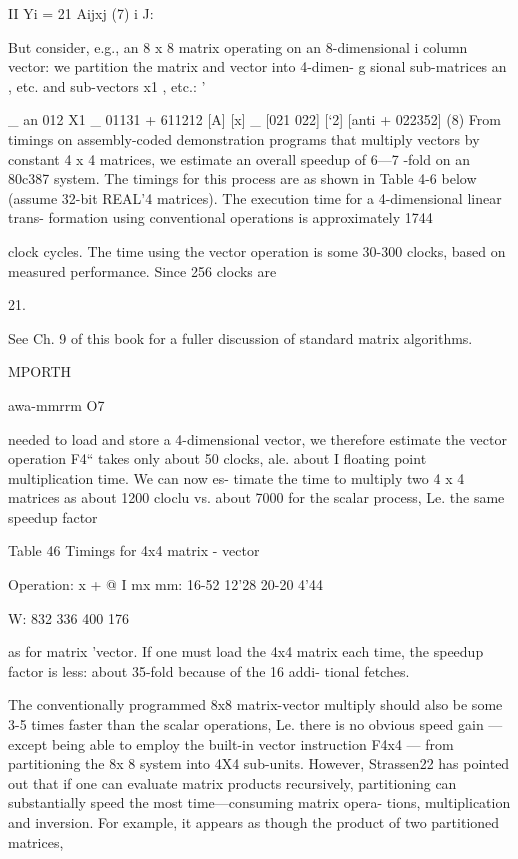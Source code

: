 {{{{{{{{{{{{{{{{   

II
Yi = 21 Aijxj (7) i
J:

But consider, e.g., an 8 x 8 matrix operating on an 8-dimensional i
column vector: we partition the matrix and vector into 4-dimen- g
sional sub-matrices an , etc. and sub-vectors x1 , etc.: '

_ an 012 X1 _ 01131 + 611212
[A] [x] _ [021 022] [‘2] [anti + 022352] (8)
From timings on assembly-coded demonstration programs that
multiply vectors by constant 4 x 4 matrices, we estimate an overall
speedup of 6—7 -fold on an 80c387 system. The timings for this
process are as shown in Table 4-6 below (assume 32-bit REAL'4
matrices). The execution time for a 4-dimensional linear trans-
formation using conventional operations is approximately 1744

clock cycles. The time using the vector operation is some 30-300
clocks, based on measured performance. Since 256 clocks are

 

21.

See Ch. 9 of this book for a fuller discussion of standard matrix algorithms.

MPORTH

awa-mmrrm O7

needed to load and store a 4-dimensional vector, we therefore
estimate the vector operation F4“ takes only about 50 clocks,
ale. about I floating point multiplication time. We can now es-
timate the time to multiply two 4 x 4 matrices as about 1200 cloclu
vs. about 7000 for the scalar process, Le. the same speedup factor

Table 46 Timings for 4x4 matrix - vector

 

Operation: x + @ I
mx mm: 16-52 12'28 20-20 4'44

W: 832 336 400 176

 

 

 

as for matrix 'vector. If one must load the 4x4 matrix each time,
the speedup factor is less: about 35-fold because of the 16 addi-
tional fetches.

The conventionally programmed 8x8 matrix-vector multiply
should also be some 3-5 times faster than the scalar operations,
Le. there is no obvious speed gain — except being able to employ
the built-in vector instruction F4x4 — from partitioning the 8x 8
system into 4X4 sub-units. However, Strassen22 has pointed out
that if one can evaluate matrix products recursively, partitioning
can substantially speed the most time—consuming matrix opera-
tions, multiplication and inversion. For example, it appears as
though the product of two partitioned matrices,

}}}}}}}}}}}}}}}}
